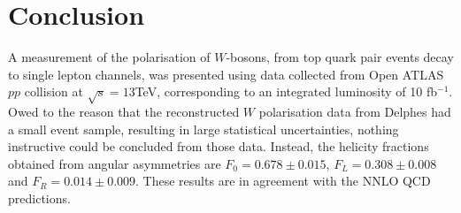 \documentclass[12pt,a4paper]{article}
\numberwithin{equation}{section}
\begin{document}

\section{Conclusion}
A measurement of the polarisation of $W$-bosons, from top quark pair events
decay to single lepton channels, was presented using data collected from Open
ATLAS $pp$ collision at $\sqrt s = 13$TeV, corresponding to an integrated
luminosity of 10 fb$^{-1}$. Owed to the reason that the reconstructed $W$
polarisation data from Delphes had a small event sample, resulting in large
statistical uncertainties, nothing instructive could be concluded from those
data. Instead, the helicity fractions obtained from angular asymmetries are
$F_0=0.678 \pm 0.015$, $F_L=0.308 \pm 0.008$ and $F_R=0.014 \pm 0.009$. These
results are in agreement with the NNLO QCD predictions.


\printbibliography
\end{document}
